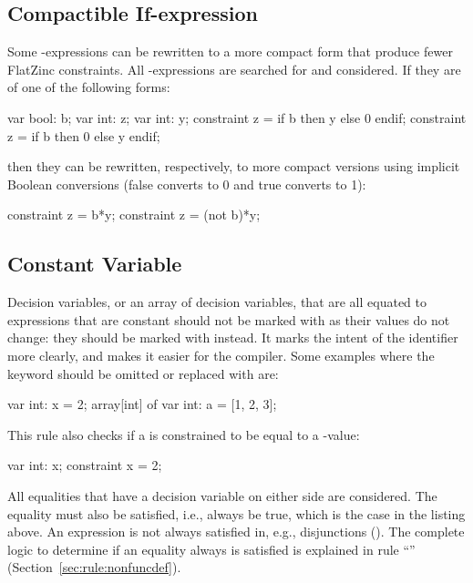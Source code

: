 \documentclass[a4paper,12pt]{article}
\newcommand{\ruleref}[1]{``\nameref{sec:rule:#1}'' (Section~\ref{sec:rule:#1})}
\begin{document}
\subsection{Compactible If-expression}\label{sec:rule:compactif}
Some -expressions can be rewritten to a more compact form that produce fewer
FlatZinc constraints. All -expressions are searched for and considered. If they are of
one of the following forms:
\begin{mznnobreak}
var bool: b; var int: z; var int: y;
constraint z = if b then y else 0 endif;
constraint z = if b then 0 else y endif;
\end{mznnobreak}
then they can be rewritten, respectively, to more compact versions using implicit Boolean conversions (false converts
to 0 and true converts to 1):
\begin{mznnobreak}
constraint z = b*y;
constraint z = (not b)*y;
\end{mznnobreak}

\subsection{Constant Variable}\label{sec:rule:constvar}
Decision variables, or an array of decision variables, that are all equated to expressions that
are constant should not be
marked with  as their values do not change: they should be marked with  instead.
It marks the intent of the identifier more
clearly, and makes it easier for the compiler. Some examples where the keyword 
should be omitted or replaced with  are:

\begin{mznnobreak}
var int: x = 2;
array[int] of var int: a = [1, 2, 3];
\end{mznnobreak}

This rule also checks if a  is constrained to be equal to a -value:

\begin{mznnobreak}
var int: x;
constraint x = 2;
\end{mznnobreak}

All equalities that have a decision variable on either side are considered. 
The equality must also be satisfied, i.e., always be true, which is the case in the listing above.
An expression is not always satisfied in, e.g., disjunctions (\mi{\\/}).
The complete logic to determine if an
equality always is satisfied is explained in rule \ruleref{nonfuncdef}.
\end{document}
